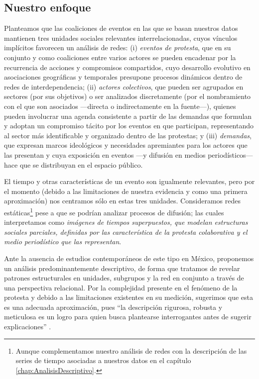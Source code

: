 \documentclass[letterpaper, 11pt]{book}
\theoremstyle{definition}
\theoremstyle{remark}
\begin{document}
\subsection{Nuestro enfoque}
\label{sec:enfoqueEPs}

Planteamos que las coaliciones de eventos en las que se basan nuestros datos mantienen tres unidades sociales relevantes interrelacionadas, cuyos vínculos implícitos favorecen un análisis de redes: 
(i) \emph{eventos de protesta}, que en su conjunto y como coaliciones entre varios actores se pueden encadenar por la recurrencia de acciones y compromisos compartidos, cuyo desarrollo evolutivo en asociaciones geográficas y temporales presupone procesos dinámicos dentro de redes de interdependencia; 
(ii) \emph{actores colectivos}, que pueden ser agrupados en sectores (por sus objetivos) o ser analizados discretamente (por el nombramiento con el que son asociados ---directa o indirectamente en la fuente---), quienes pueden involucrar una agenda consistente a partir de las demandas que formulan y adoptan un compromiso tácito por los eventos en que participan, representando al sector más identificable y organizado dentro de las protestas; y 
(iii) \emph{demandas}, que expresan marcos ideológicos y necesidades apremiantes para los actores que las presentan y cuya exposición en eventos ---y difusión en medios periodísticos--- hace que se distribuyan en el espacio público. 


El tiempo y otras características de un evento son igualmente relevantes, pero por el momento (debido a las limitaciones de nuestra evidencia y como una primera aproximación) nos centramos sólo en estas tres unidades. 
Consideramos redes estáticas\footnote{
    Aunque complementamos nuestro análisis de redes con la descripción de las series de tiempo asociadas a nuestros datos en el capítulo \ref{chap:AnalisisDescriptivo}. 
} pese a que se podrían analizar procesos de difusión; las cuales interpretamos como \emph{imágenes de tiempos superpuestos, que modelan estructuras sociales parciales, definidas por las característica de la protesta colaborativa y el medio periodístico que las representan}. 


Ante la ausencia de estudios contemporáneos de este tipo en México, proponemos un análisis predominantemente descriptivo, de forma que tratamos de revelar patrones estructurales en unidades, subgrupos y la red en conjunto a través de una perspectiva relacional. 
Por la complejidad presente en el fenómeno de la protesta y debido a las limitaciones existentes en su medición, sugerimos que esta es una adecuada aproximación, pues ``la descripción rigurosa, robusta y meticulosa es un logro para quien busca plantearse interrogantes antes de sugerir explicaciones'' \citep[36]{2017_Urbina_estudiantes}.
\end{document}
